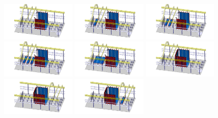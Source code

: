 \begin{figure}[!t]
\includegraphics[width=0.32\textwidth]{./Figures/assembly_sequence_11_07/18.png}
\includegraphics[width=0.32\textwidth]{./Figures/assembly_sequence_11_07/19.png}
\includegraphics[width=0.32\textwidth]{./Figures/assembly_sequence_11_07/20.png}
\includegraphics[width=0.32\textwidth]{./Figures/assembly_sequence_11_07/21.png}
\includegraphics[width=0.32\textwidth]{./Figures/assembly_sequence_11_07/22.png}
\includegraphics[width=0.32\textwidth]{./Figures/assembly_sequence_11_07/23.png}
\includegraphics[width=0.32\textwidth]{./Figures/assembly_sequence_11_07/24.png}
\includegraphics[width=0.32\textwidth]{./Figures/assembly_sequence_11_07/25.png}

\end{figure}
